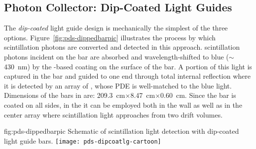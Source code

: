 
\subsection{Photon Collector: Dip-Coated Light Guides}
\label{ssec:fdsp-pd-pc-bar1}


The \textit{dip-coated} light guide design is mechanically the simplest of the three options. Figure~\ref{fig:pds-dippedbarpic} illustrates the process by which \lar scintillation photons are converted and detected in this approach.   scintillation photons incident on the bar are absorbed and wavelength-shifted to blue ($\sim$\SI{430}{nm}) by the -based coating on the surface of the bar.  A portion of this light is captured in the bar and guided to one end through total internal reflection where it is detected by an array of , whose PDE is well-matched to the blue light.  Dimensions of the bars in  are: \SI{209.3}{cm}$\times$\SI{8.47}{cm}$\times$\SI{0.60}{cm}.
Since the bar is coated on all sides, in the  it can be employed both in the wall  as well as in the center  array where scintillation light approaches from two drift volumes.

\begin{dunefigure}{fig:pds-dippedbarpic}
{Schematic of scintillation light detection with dip-coated light guide bars.}
  \texttt{[image: pds-dipcoatlg-cartoon]}
\end{dunefigure}


